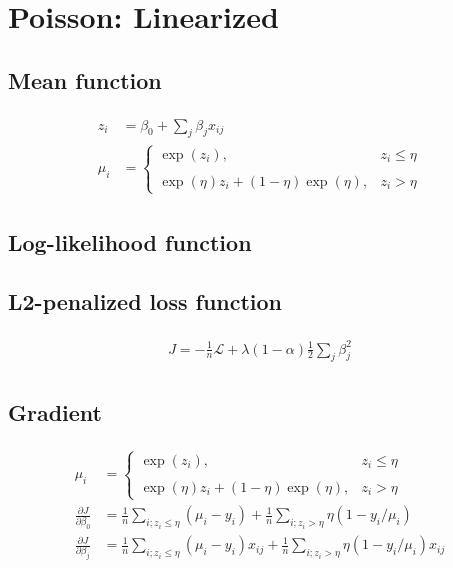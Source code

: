 \documentclass[a4paper]{article}
\begin{document}
\section{Poisson: Linearized}

\subsection{Mean function}
\def \poissonexpmean{
\begin{align}
\begin{split}
z_i &= \beta_0 + \sum_j \beta_j x_{ij} \\
\mu_i &= 
\begin{cases}
\exp(z_i), & z_i \leq \eta \\
\\
\exp(\eta)z_i + (1-\eta)\exp(\eta), & z_i > \eta
\end{cases}
\end{split}
\end{align}
}
\poissonexpmean

\subsection{Log-likelihood function}
\poissonlogL

\subsection{L2-penalized loss function}
\def \poissonexploss{
\begin{align}
\begin{split}
J = -\frac{1}{n} \mathcal{L} + \lambda (1 - \alpha) \frac{1}{2} \sum_j \beta_j^2
\end{split}
\end{align}
}
\poissonexploss

\subsection{Gradient}
\def \poissonexpgrad{
\begin{align}
\begin{split}
\mu_i &= 
\begin{cases}
\exp(z_i),  & z_i \leq \eta \\
\\
\exp(\eta)z_i + (1-\eta)\exp(\eta),  & z_i > \eta
\end{cases}
\\
\frac{\partial J}{\partial \beta_0} &= \frac{1}{n}\sum_{i; z_i \leq \eta} (\mu_i - y_i)
+ \frac{1}{n}\sum_{i; z_i > \eta} \eta (1 - y_i/\mu_i) \\
\frac{\partial J}{\partial \beta_j} &= \frac{1}{n}\sum_{i; z_i \leq \eta} (\mu_i - y_i) x_{ij}
+ \frac{1}{n}\sum_{i; z_i > \eta} \eta (1 - y_i/\mu_i) x_{ij}
\end{split}
\end{align}}
\poissonexpgrad
\end{document}
